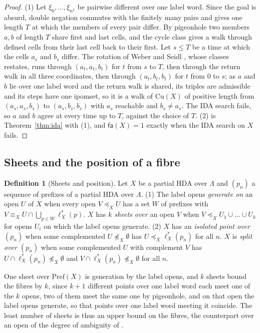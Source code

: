 \documentclass{lmcs}
\theoremstyle{definition}
\newtheorem{definition}[theorem]{Definition}
\theoremstyle{remark}
\newcommand{\Pref}{\mathrm{Pref}}
\newcommand{\fle}[1]{\preceq_{#1}}
\newcommand{\feq}[1]{\equiv_{#1}}
\providecommand{\Cu}[1]{\mathrm{Cu}(#1)}
\providecommand{\lst}[1]{\ell^{*}_{#1}}
\begin{document}
\begin{proof}
(1) Let $\xi_0,\dots,\xi_{n^2}$ be pairwise different over one label word. Since the goal is absurd, double negation
commutes with the finitely many pairs and gives one length $T$ at which the members of every pair
differ. By pigeonhole two
members $a,b$ of length $T$ share first and last cells, and the
cycle class gives a walk through defined cells from their last cell back to their first. Let
$s\leq T$ be a time at which the cells $a_s$ and $b_s$ differ. The rotation of Weber and
Seidl \cite{WS91}, whose classes \cite{LP18} restates, runs through $(a_t,a_t,b_t)$ for $t$ from $s$ to $T$,
then through the return walk in all three coordinates, then through $(a_t,b_t,b_t)$ for $t$ from $0$ to $s$; as $a$
and $b$ lie over one label word and the return walk is shared, its triples are admissible and its steps have one
ipomset, so it is a walk of $\Cu{X}$ of positive length from $(a_s,a_s,b_s)$ to $(a_s,b_s,b_s)$ with $a_s$ reachable and
$b_s\neq a_s$. The IDA search fails, so $a$ and $b$ agree at every time up to $T$, against the choice of
$T$.
(2) is Theorem~\ref{thm:ida} with (1), and $\mathsf{fa}(X)=1$ exactly when the IDA search on $X$
fails.
\end{proof}

\subsection{Sheets and the position of a fibre}\label{ssec:image-sheets}

\begin{definition}[Sheets and position]\label{def:image-sheets}\label{def:isol}\label{def:image-split}
Let $X$ be a partial HDA over $\Lambda$ and $(p_n)$ a sequence of prefixes of a partial HDA
over $\Lambda$.
(1) The label opens \emph{generate on} an open $U$ of $X$ when every open $V\fle{X}U$ has a set $W$ of prefixes
with $V\feq{X}U\cap\bigcup_{p\in W}\lst{X}(p)$. $X$ has \emph{$k$ sheets over} an open $V$ when
$V\fle{X}U_1\cup\dots\cup U_k$ for opens $U_i$ on which the label opens
generate.
(2) $X$ has an \emph{isolated point over $(p_n)$} when
some complemented $U\not\fle{X}\emptyset$ has $U\fle{X}\lst{X}(p_n)$ for all $n$.
$X$ is \emph{split over $(p_n)$} when some complemented $U$ with complement $V$ has $U\cap\lst{X}(p_n)\not\fle{X}\emptyset$ and $V\cap\lst{X}(p_n)\not\fle{X}\emptyset$ for
all $n$.
\end{definition}

One sheet over $\Pref(X)$ is generation by the label opens, and $k$ sheets
bound the fibres by $k$, since $k+1$ different points over one label word each meet
one of the $k$ opens, two of them meet the same one by pigeonhole, and on that open the label opens generate, so that
points over one label word meeting it coincide.
The least number of sheets is thus an upper bound on the fibres, the counterpart over an open of the degree of
ambiguity of \cite{LP18}.
\end{document}
